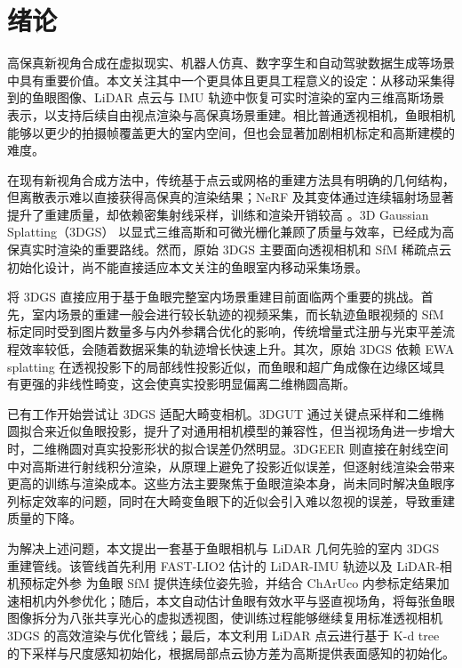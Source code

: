 \cleardoublepage

\section{绪论}

高保真新视角合成在虚拟现实、机器人仿真、数字孪生和自动驾驶数据生成等场景中具有重要价值。本文关注其中一个更具体且更具工程意义的设定：从移动采集得到的鱼眼图像、LiDAR 点云与 IMU 轨迹中恢复可实时渲染的室内三维高斯场景表示，以支持后续自由视点渲染与高保真场景重建。相比普通透视相机，鱼眼相机能够以更少的拍摄帧覆盖更大的室内空间，但也会显著加剧相机标定和高斯建模的难度。

在现有新视角合成方法中，传统基于点云或网格的重建方法具有明确的几何结构，但离散表示难以直接获得高保真的渲染结果；NeRF 及其变体通过连续辐射场显著提升了重建质量，却依赖密集射线采样，训练和渲染开销较高 \cite{mildenhall2021nerf,muller2022instant,fridovich2022plenoxels}。3D Gaussian Splatting（3DGS） \cite{kerbl2023} 以显式三维高斯和可微光栅化兼顾了质量与效率，已经成为高保真实时渲染的重要路线。然而，原始 3DGS 主要面向透视相机和 SfM 稀疏点云初始化设计，尚不能直接适应本文关注的鱼眼室内移动采集场景。

将 3DGS 直接应用于基于鱼眼完整室内场景重建目前面临两个重要的挑战。首先，室内场景的重建一般会进行较长轨迹的视频采集，而长轨迹鱼眼视频的 SfM 标定同时受到图片数量多与内外参耦合优化的影响，传统增量式注册与光束平差流程效率较低，会随着数据采集的轨迹增长快速上升。其次，原始 3DGS 依赖 EWA splatting \cite{zwicker2002ewa} 在透视投影下的局部线性投影近似，而鱼眼和超广角成像在边缘区域具有更强的非线性畸变，这会使真实投影明显偏离二维椭圆高斯。

已有工作开始尝试让 3DGS 适配大畸变相机。3DGUT \cite{wu20253dgut} 通过关键点采样和二维椭圆拟合来近似鱼眼投影，提升了对通用相机模型的兼容性，但当视场角进一步增大时，二维椭圆对真实投影形状的拟合误差仍然明显。3DGEER \cite{huang20253dgeer} 则直接在射线空间中对高斯进行射线积分渲染，从原理上避免了投影近似误差，但逐射线渲染会带来更高的训练与渲染成本。这些方法主要聚焦于鱼眼渲染本身，尚未同时解决鱼眼序列标定效率的问题，同时在大畸变鱼眼下的近似会引入难以忽视的误差，导致重建质量的下降。

为解决上述问题，本文提出一套基于鱼眼相机与 LiDAR 几何先验的室内 3DGS 重建管线。该管线首先利用 FAST-LIO2 \cite{xu2022fastlio2} 估计的 LiDAR-IMU 轨迹以及 LiDAR-相机预标定外参 \cite{yuan2021pixel} 为鱼眼 SfM 提供连续位姿先验，并结合 ChArUco 内参标定结果加速相机内外参优化；随后，本文自动估计鱼眼有效水平与竖直视场角，将每张鱼眼图像拆分为八张共享光心的虚拟透视图，使训练过程能够继续复用标准透视相机 3DGS 的高效渲染与优化管线；最后，本文利用 LiDAR 点云进行基于 K-d tree 的下采样与尺度感知初始化，根据局部点云协方差为高斯提供表面感知的初始化。

